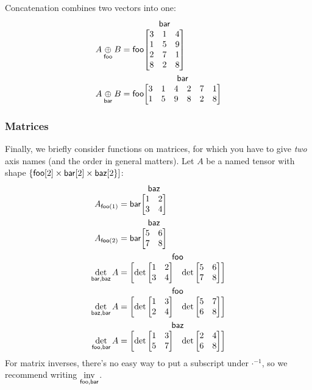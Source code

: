 \documentclass{article}
\makeatletter
\newcommand{\nmatrix}[3]{\name{#1}\begin{array}[b]{@{}c@{}}\name{#2}\\\begin{bmatrix}#3\end{bmatrix}\end{array}}
\makeatother
\begin{document}
Concatenation combines two vectors into one:
\begin{align*}
  A \ncat{foo} B &= \nmatrix{foo}{bar}{
    3 & 1 & 4 \\
    1 & 5 & 9 \\
    2 & 7 & 1 \\
    8 & 2 & 8
  } \\
  A \ncat{bar} B &= \nmatrix{foo}{bar}{
    3 & 1 & 4 & 2 & 7 & 1 \\
    1 & 5 & 9 & 8 & 2 & 8
  }
\end{align*}

\subsubsection{Matrices}

Finally, we briefly consider functions on matrices, for which you have to give \emph{two} axis names (and the order in general matters). Let $A$ be a named tensor with shape $\{\nset{foo}{2} \times\nset{bar}{2} \times\nset{baz}{2\}}$:
\begin{align*}
A_{\nidx{foo}{1}} &= \nmatrix{bar}{baz}{
  1 & 2 \\
  3 & 4
} \\
A_{\nidx{foo}{2}} &= \nmatrix{bar}{baz}{
  5 & 6 \\
  7 & 8
} \\
\nfun{bar,baz}{det} A &= \nmatrix{}{foo}{\det \begin{bmatrix} 1 & 2 \\ 3 & 4 \end{bmatrix} & \det \begin{bmatrix} 5 & 6 \\ 7 & 8 \end{bmatrix}} \\
\nfun{baz,bar}{det} A &= \nmatrix{}{foo}{\det \begin{bmatrix} 1 & 3 \\ 2 & 4 \end{bmatrix} & \det \begin{bmatrix} 5 & 7 \\ 6 & 8 \end{bmatrix}} \\
\nfun{foo,bar}{det} A &= \nmatrix{}{baz}{\det \begin{bmatrix} 1 & 3 \\ 5 & 7 \end{bmatrix} & \det \begin{bmatrix} 2 & 4 \\ 6 & 8 \end{bmatrix}}
\end{align*}
For matrix inverses, there's no easy way to put a subscript under $\mathord\cdot^{-1}$, so we recommend writing $\nfun{foo,bar}{inv}$.
\end{document}
